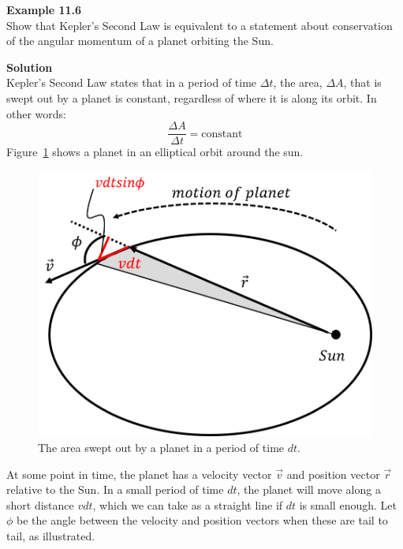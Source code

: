 \begin{framed}
\textbf{Example 11.6}\\
Show that Kepler's Second Law is equivalent to a statement about conservation of the angular momentum of a planet orbiting the Sun.

\begin{framed}
\textbf{Solution}\\
Kepler's Second Law states that in a period of time $\Delta t$, the area, $\Delta A$, that is swept out by a planet is constant, regardless of where it is along its orbit. In other words:
\begin{equation}
\frac{\Delta A}{\Delta t} = \text{constant}
\end{equation}
Figure~\ref{fig:angularmomentumrolling:kepler} shows a planet in an elliptical orbit around the sun.

\begin{figure}[!htbp]
\centering
\includegraphics[width=0.5\linewidth]{files/kepler-4f0dc3c3a6aa1990dece4a276ade8e92.png}
\caption[]{The area swept out by a planet in a period of time $dt$.}
\label{fig:angularmomentumrolling:kepler}
\end{figure}

At some point in time, the planet has a velocity vector $\vec v$ and position vector $\vec r$ relative to the Sun. In a small period of time $dt$, the planet will move along a short distance $vdt$, which we can take as a straight line if $dt$ is small enough. Let $\phi$ be the angle between the velocity and position vectors when these are tail to tail, as illustrated.


\end{framed}
\end{framed}
